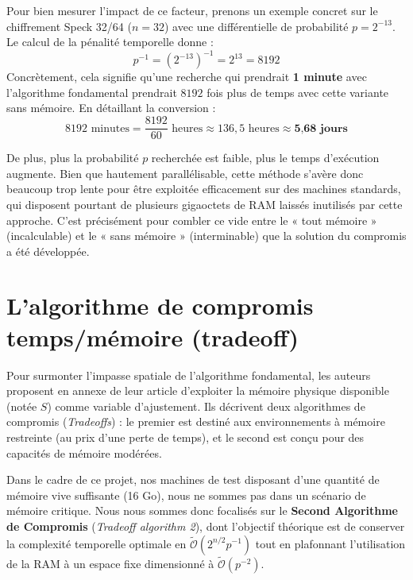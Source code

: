 \documentclass[a4paper,11pt]{article}
\begin{document}
Pour bien mesurer l'impact de ce facteur, prenons un exemple concret sur le chiffrement Speck 32/64 ($n=32$) avec une différentielle de probabilité $p=2^{-13}$. Le calcul de la pénalité temporelle donne :
\begin{equation*}
    p^{-1} = (2^{-13})^{-1} = 2^{13} = 8192
\end{equation*}
Concrètement, cela signifie qu'une recherche qui prendrait \textbf{1 minute} avec l'algorithme fondamental prendrait $8192$ fois plus de temps avec cette variante sans mémoire. En détaillant la conversion :
\begin{equation*}
    8192 \text{ minutes} = \frac{8192}{60} \text{ heures} \approx 136,5 \text{ heures} \approx \textbf{5,68 jours}
\end{equation*}

De plus, plus la probabilité $p$ recherchée est faible, plus le temps d'exécution augmente. Bien que hautement parallélisable, cette méthode s'avère donc beaucoup trop lente pour être exploitée efficacement sur des machines standards, qui disposent pourtant de plusieurs gigaoctets de RAM laissés inutilisés par cette approche. C'est précisément pour combler ce vide entre le « tout mémoire » (incalculable) et le « sans mémoire » (interminable) que la solution du compromis a été développée.

\section{L'algorithme de compromis temps/mémoire (tradeoff)}

Pour surmonter l'impasse spatiale de l'algorithme fondamental, les auteurs proposent en annexe de leur article d'exploiter la mémoire physique disponible (notée $S$) comme variable d'ajustement. Ils décrivent deux algorithmes de compromis (\textit{Tradeoffs}) : le premier est destiné aux environnements à mémoire restreinte (au prix d'une perte de temps), et le second est conçu pour des capacités de mémoire modérées.

Dans le cadre de ce projet, nos machines de test disposant d'une quantité de mémoire vive suffisante (16 Go), nous ne sommes pas dans un scénario de mémoire critique. Nous nous sommes donc focalisés sur le \textbf{Second Algorithme de Compromis} (\textit{Tradeoff algorithm 2}), dont l'objectif théorique est de conserver la complexité temporelle optimale en $\tilde{\mathcal{O}}(2^{n/2} p^{-1})$ tout en plafonnant l'utilisation de la RAM à un espace fixe dimensionné à $\tilde{\mathcal{O}}(p^{-2})$.
\end{document}
